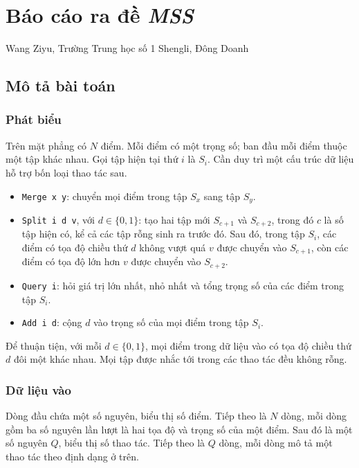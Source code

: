 \documentclass[11pt]{article}
\begin{document}
\section{Báo cáo ra đề \emph{MSS}}

\begin{center}
Wang Ziyu, Trường Trung học số 1 Shengli, Đông Doanh
\end{center}

\subsection{Mô tả bài toán}

\subsubsection{Phát biểu}

Trên mặt phẳng có \(N\) điểm. Mỗi điểm có một trọng số; ban đầu mỗi điểm thuộc
một tập khác nhau. Gọi tập hiện tại thứ \(i\) là \(S_i\). Cần duy trì một cấu
trúc dữ liệu hỗ trợ bốn loại thao tác sau.

\begin{itemize}
  \item \texttt{Merge x y}: chuyển mọi điểm trong tập \(S_x\) sang tập \(S_y\).
  \item \texttt{Split i d v}, với \(d\in\{0,1\}\): tạo hai tập mới
  \(S_{c+1}\) và \(S_{c+2}\), trong đó \(c\) là số tập hiện có, kể cả các tập
  rỗng sinh ra trước đó. Sau đó, trong tập \(S_i\), các điểm có tọa độ chiều
  thứ \(d\) không vượt quá \(v\) được chuyển vào \(S_{c+1}\), còn các điểm có
  tọa độ lớn hơn \(v\) được chuyển vào \(S_{c+2}\).
  \item \texttt{Query i}: hỏi giá trị lớn nhất, nhỏ nhất và tổng trọng số của
  các điểm trong tập \(S_i\).
  \item \texttt{Add i d}: cộng \(d\) vào trọng số của mọi điểm trong tập
  \(S_i\).
\end{itemize}

Để thuận tiện, với mỗi \(d\in\{0,1\}\), mọi điểm trong dữ liệu vào có tọa độ
chiều thứ \(d\) đôi một khác nhau. Mọi tập được nhắc tới trong các thao tác đều
không rỗng.

\subsubsection{Dữ liệu vào}

Dòng đầu chứa một số nguyên, biểu thị số điểm. Tiếp theo là \(N\) dòng, mỗi dòng
gồm ba số nguyên lần lượt là hai tọa độ và trọng số của một điểm. Sau đó là một
số nguyên \(Q\), biểu thị số thao tác. Tiếp theo là \(Q\) dòng, mỗi dòng mô tả
một thao tác theo định dạng ở trên.
\end{document}
